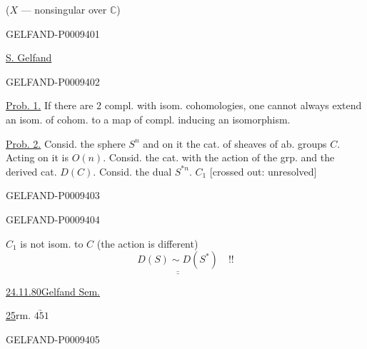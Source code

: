 ($X$ --- nonsingular over $\mathbb C$)

\begin{GelfandAdjacentEvidence}{GELFAND-P000940}{1}

\underline{S. Gelfand}

\end{GelfandAdjacentEvidence}
\begin{GelfandAdjacentEvidence}{GELFAND-P000940}{2}


\underline{Prob. 1.} If there are 2 compl. with isom. cohomologies, one cannot always extend an isom. of cohom. to a map of compl. inducing an isomorphism.

\underline{Prob. 2.} Consid. the sphere $S^n$ and on it the cat. of sheaves of ab. groups $C$. Acting on it is $O(n)$.
Consid. the cat. with the action of the grp. and the derived cat. $D(C)$. Consid. the dual $S^{*n}$. $C_1$ [crossed out: unresolved]
\end{GelfandAdjacentEvidence}
\begin{GelfandAdjacentEvidence}{GELFAND-P000940}{3}

\end{GelfandAdjacentEvidence}
\begin{GelfandAdjacentEvidence}{GELFAND-P000940}{4}


$C_1$ is not isom. to $C$ (the action is different)
\[
 \underline{\underline{D(S)\sim D(S^*)}}\quad!!
\]

\underline{24.11.80}\qquad\underline{Gelfand Sem.}


\underline{25}\quad rm. \(\underrightarrow{451}\)
\end{GelfandAdjacentEvidence}
\begin{GelfandAdjacentEvidence}{GELFAND-P000940}{5}

\end{GelfandAdjacentEvidence}
